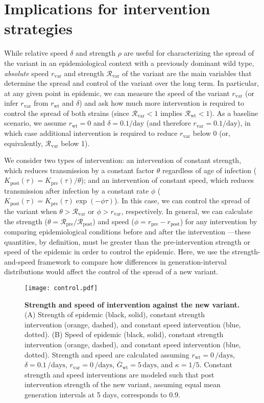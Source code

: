 \documentclass[12pt]{article}
\newcommand{\vvvar}{\mathrm{var}}
\newcommand{\wwwt}{\mathrm{wt}}
\newcommand{\rx}[1]{\ensuremath{{r}_{#1}}\xspace}
\newcommand{\ry}[1]{\rx{\mathrm{#1}}}
\newcommand{\rw}{\rx{\wwwt}}
\newcommand{\rv}{\rx{\vvvar}}
\newcommand{\Rx}[1]{\ensuremath{{\mathcal R}_{#1}}\xspace}
\newcommand{\Ry}[1]{\Rx{\mathrm{#1}}}
\newcommand{\Rw}{\Rx{\wwwt}}
\newcommand{\Rv}{\Rx{\vvvar}}
\newcommand{\pday}{\ensuremath{/\textrm{day}}}
\newcommand{\Gx}[1]{\ensuremath{{\bar G}_{#1}}\xspace}
\newcommand{\Gy}[1]{\Gx{\mathrm{#1}}}
\begin{document}
\section{Implications for intervention strategies}

While relative speed $\delta$ and strength $\rho$ are useful for characterizing the spread of the variant in an epidemiological context with a previously dominant wild type, \emph{absolute} speed $\rv$ and strength $\Rv$ of the variant are the main variables that determine the spread and control of the variant over the long term.
In particular, at any given point in epidemic, we can measure the speed of the variant $\rv$ (or infer $\rv$ from $\rw$ and $\delta$) and ask how much more intervention is required to control the spread of both strains (since $\Rv < 1$ implies $\Rw < 1$).
As a baseline scenario, we assume $\rw=0$ and $\delta=0.1\pday$ (and therefore $\rv=0.1\pday$), in which case additional intervention is required to reduce $\rv$ below 0 (or, equivalently, $\Rv$ below 1).

We consider two types of intervention:
an intervention of constant strength, which reduces transmission by a constant factor $\theta$ regardless of age of infection ($K_{\mathrm{post}}(\tau) = K_{\mathrm{pre}}(\tau)/\theta$); and an intervention of constant speed, which reduces transmission after infection by a constant rate $\phi$ ($K_{\mathrm{post}}(\tau) = K_{\mathrm{pre}}(\tau) \exp(-\phi \tau)$).
In this case, we can control the spread of the variant when $\theta > \Rv$ or $\phi > \rv$, respectively.
In general, we can calculate the strength ($\theta = \Ry{pre}/\Ry{post}$) and speed ($\phi = \ry{pre} - \ry{post}$) for any intervention by comparing epidemiological conditions before and after the intervention \citep{doi:10.1098/rspb.2020.1556}---these quantities, by definition, must be greater than the pre-intervention strength or speed of the epidemic in order to control the epidemic.
Here, we use the strength-and-speed framework to compare how differences in generation-interval distributions would affect the control of the spread of a new variant.

\begin{figure}[!th]
\texttt{[image: control.pdf]}
\caption{
\textbf{Strength and speed of intervention against the new variant.}
(A) Strength of epidemic (black, solid), constant strength intervention (orange, dashed), and constant speed intervention (blue, dotted).
(B) Speed of epidemic (black, solid), constant strength intervention (orange, dashed), and constant speed intervention (blue, dotted).
Strength and speed are calculated assuming $\rw=0\,\textrm{/days}$, $\delta=0.1\,\textrm{/days}$, $\rv=0\,\textrm{/days}$, $\Gy{wt}=5\,\textrm{days}$, and $\kappa=1/5$.
Constant strength and speed interventions are modeled such that post intervention strength of the new variant, assuming equal mean generation intervals at 5 days, corresponds to 0.9.
}
\label{fig:strengthspeed}
\end{figure}
\end{document}
